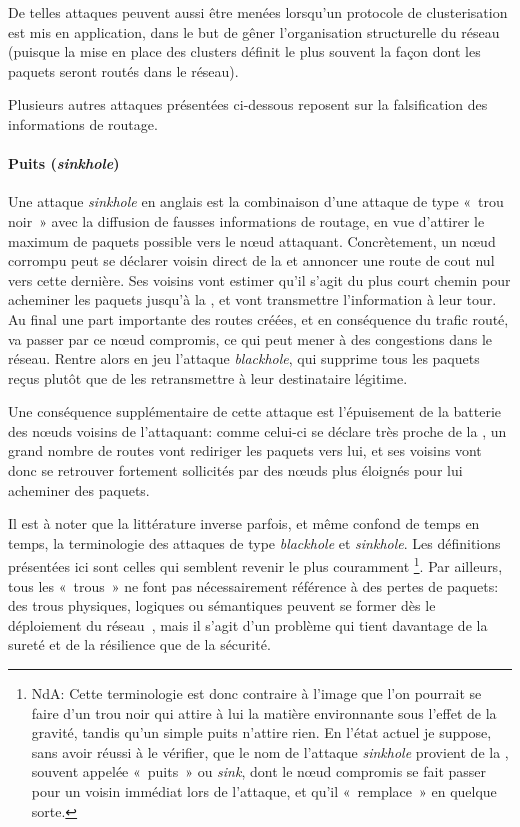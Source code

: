 De telles attaques peuvent aussi être menées lorsqu'un protocole de clusterisation est mis en application, dans le but de gêner l'organisation structurelle du réseau (puisque la mise en place des clusters définit le plus souvent la façon dont les paquets seront routés dans le réseau).

Plusieurs autres attaques présentées ci-dessous reposent sur la falsification des informations de routage.

        \paragraph{Puits (\textit{sinkhole})}
Une attaque \textit{sinkhole} en anglais est la combinaison d'une attaque de type « trou noir » avec la diffusion de fausses informations de routage, en vue d'attirer le maximum de paquets possible vers le nœud attaquant.
Concrètement, un nœud corrompu peut se déclarer voisin direct de la \sdb et annoncer une route de cout nul vers cette dernière.
Ses voisins vont estimer qu'il s'agit du plus court chemin pour acheminer les paquets jusqu'à la \sdb, et vont transmettre l'information à leur tour.
Au final une part importante des routes créées, et en conséquence du trafic routé, va passer par ce nœud compromis, ce qui peut mener à des congestions dans le réseau.
Rentre alors en jeu l'attaque \textit{blackhole}, qui supprime tous les paquets reçus plutôt que de les retransmettre à leur destinataire légitime.

Une conséquence supplémentaire de cette attaque est l'épuisement de la batterie des nœuds voisins de l'attaquant: comme celui-ci se déclare très proche de la \sdb, un grand nombre de routes vont rediriger les paquets vers lui, et ses voisins vont donc se retrouver fortement sollicités par des nœuds plus éloignés pour lui acheminer des paquets.

Il est à noter que la littérature inverse parfois, et même confond de temps en temps, la terminologie des attaques de type \textit{blackhole} et \textit{sinkhole}.
Les définitions présentées ici sont celles qui semblent revenir le plus couramment%
\footnote{%
    NdA: Cette terminologie est donc contraire à l'image que l'on pourrait se faire d'un trou noir qui attire à lui la matière environnante sous l'effet de la gravité, tandis qu'un simple puits n'attire rien.
    En l'état actuel je suppose, sans avoir réussi à le vérifier, que le nom de l'attaque \textit{sinkhole} provient de la \sdb, souvent appelée « puits » ou \textit{sink}, dont le nœud compromis se fait passer pour un voisin immédiat lors de l'attaque, et qu'il « remplace » en quelque sorte.%
}.
Par ailleurs, tous les « trous » ne font pas nécessairement référence à des pertes de paquets: des trous physiques, logiques ou sémantiques peuvent se former dès le déploiement du réseau~\cite{JSM13}, mais il s'agit d'un problème qui tient davantage de la sureté et de la résilience que de la sécurité.

